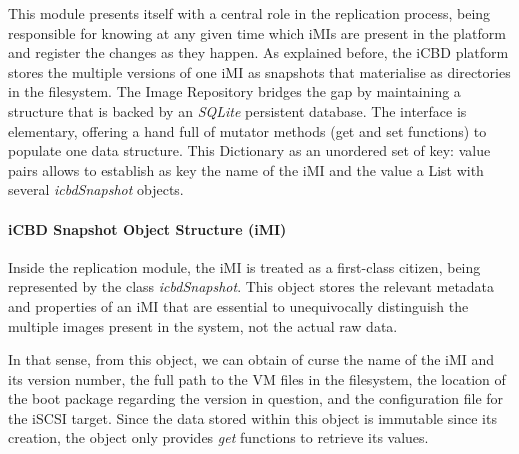This module presents itself with a central role in the replication process, being responsible for knowing at any given time which iMIs are present in the platform and register the changes as they happen.
As explained before, the iCBD platform stores the multiple versions of one iMI as snapshots that materialise as directories in the filesystem. The Image Repository bridges the gap by maintaining a structure that is backed by an \textit{SQLite} persistent database. The interface is elementary, offering a hand full of mutator methods (get and set functions) to populate one data structure. This Dictionary as an unordered set of key: value pairs allows to establish as key the name of the iMI and the value a List with several \textit{icbdSnapshot} objects. 

\paragraph{iCBD Snapshot Object Structure (iMI)}
\label{par:icbd_snapshot}

Inside the replication module, the iMI is treated as a first-class citizen, being represented by the class \textit{icbdSnapshot}. This object stores the relevant metadata and properties of an iMI that are essential to unequivocally distinguish the multiple images present in the system, not the actual raw data.

In that sense, from this object, we can obtain of curse the name of the iMI and its version number, the full path to the VM files in the filesystem, the location of the boot package regarding the version in question, and the configuration file for the iSCSI target. Since the data stored within this object is immutable since its creation, the object only provides \textit{get} functions to retrieve its values. 

